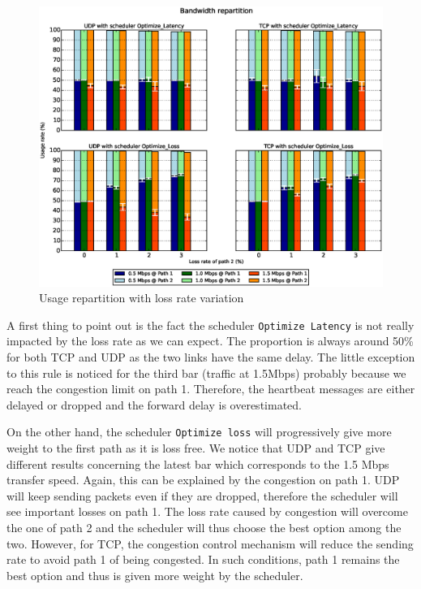 \begin{figure}[!h]
\centering
\includegraphics[width=\textwidth]{images/xp/graph2.eps}
\caption{Usage repartition with loss rate variation}
\label{fig:dynloss}
\end{figure}

A first thing to point out is the fact the scheduler \texttt{Optimize Latency} is not really impacted by the loss rate as we can expect. The proportion is always around 50\% for both TCP and UDP as the two links have the same delay. The little exception to this rule is noticed for the third bar (traffic at 1.5Mbps) probably because we reach the congestion limit on path 1. Therefore, the heartbeat messages are either delayed or dropped and the forward delay is overestimated.

On the other hand, the scheduler \texttt{Optimize loss} will progressively give more weight to the first path as it is loss free. We notice that UDP and TCP give different results concerning the latest bar which corresponds to the 1.5 Mbps transfer speed. Again, this can be explained by the congestion on path 1. UDP will keep sending packets even if they are dropped, therefore the scheduler will see important losses on path 1. The loss rate caused by congestion will overcome the one of path 2 and the scheduler will thus choose the best option among the two. However, for TCP, the congestion control mechanism will reduce the sending rate to avoid path 1 of being congested. In such conditions, path 1 remains the best option and thus is given more weight by the scheduler.


